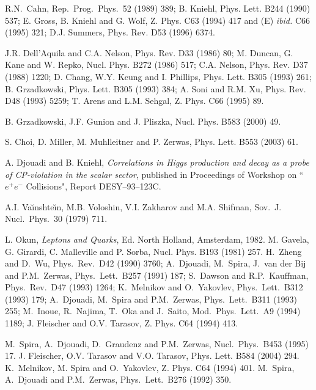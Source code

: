 \begin{thebibliography}{999}
R.N.\ Cahn, Rep.\ Prog.\ Phys.\ 52 (1989) 389;
B. Kniehl, Phys. Lett. B244 (1990) 537; 
E. Gross, B. Kniehl and G. Wolf, Z. Phys. C63 (1994) 417 and (E) {\it ibid.} 
C66 (1995) 321; D.J. Summers, Phys. Rev. D53 (1996) 6374. 
 
J.R. Dell'Aquila and C.A. Nelson, Phys. Rev. D33 (1986) 80;
M. Duncan, G. Kane and W. Repko, Nucl. Phys. B272 (1986) 517;
C.A. Nelson, Phys. Rev. D37 (1988) 1220; 
D. Chang, W.Y. Keung and I. Phillips, Phys. Lett. B305 (1993) 261;  
B. Grzadkowski, Phys. Lett. B305 (1993) 384;
A. Soni and R.M. Xu, Phys. Rev. D48 (1993) 5259; 
T. Arens and L.M. Sehgal, Z. Phys. C66 (1995) 89. 

B. Grzadkowski, J.F. Gunion and J. Pliszka, Nucl. Phys. B583 (2000) 49. 
   
 S. Choi, D. Miller, M. Muhlleitner and P. Zerwas,
Phys. Lett. B553 (2003) 61. 

 A. Djouadi and B. Kniehl, {\it Correlations in Higgs 
production and decay as a probe of CP-violation  in the scalar sector},
published in Proceedings  of Workshop on ``$e^+ e^-$ Collisions", Report 
DESY--93--123C. 

 A.I. Va\u\i nshte\u\i n, M.B. Voloshin, V.I. Zakharov and M.A. Shifman, Sov.\ 
J. Nucl.\ Phys.\ 30 (1979) 711. 

L. Okun, {\it Leptons and Quarks}, Ed. North Holland, Amsterdam, 1982. 
%
 M. Gavela, G. Girardi, C. Malleville and P. Sorba,
Nucl. Phys. B193 (1981) 257.   
%
H.~Zheng and D.~Wu, Phys.~Rev.~D42 (1990) 3760;  
A.\ Djouadi, M.\ Spira, J.\ van der Bij and P.M.\ Zerwas, Phys.\ Lett.\
B257 (1991) 187;  
S.~Dawson and R.P.~Kauffman, Phys.\ Rev.\ D47 (1993) 1264; 
K.~Melnikov and O.~Yakovlev, Phys.\ Lett.\ B312 (1993) 179; 
A.\ Djouadi, M.\ Spira and P.M.\ Zerwas, Phys.\ Lett.\ B311 (1993) 255; 
M.\ Inoue, R.\ Najima, T.\ Oka and J.\ Saito, Mod.\ Phys.\ Lett.\ A9
(1994) 1189;
J. Fleischer and O.V. Tarasov, Z. Phys. C64 (1994) 413.
 
  M.\ Spira, A.\ Djouadi, D.\ Graudenz and P.M.\ Zerwas,
Nucl.\ Phys.\ B453 (1995) 17.
%
J. Fleischer, O.V. Tarasov and V.O. Tarasov, Phys. Lett. B584 (2004) 294.
%
\bibitem{AppCoulomb} K.~Melnikov, M. Spira and O.~Yakovlev, Z. Phys. C64 
(1994) 401.
%
\bibitem{HZpQCD} M.\ Spira, A.\ Djouadi and P.M.\ Zerwas, Phys.\ Lett.\
B276 (1992) 350.


\end{thebibliography}
